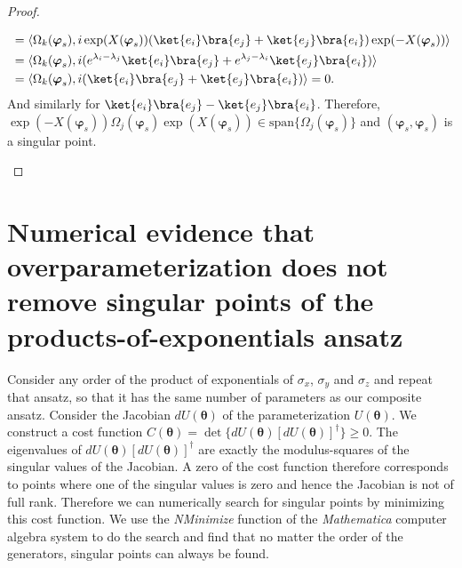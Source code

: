 \documentclass{article}
\renewcommand{\vec}[1]{\ensuremath{\boldsymbol{#1}}}
\begin{document}
\begin{proof}
\begin{itemize}
\begin{align}
            & = \langle \Omega_k(\vec{\varphi}_s), i\exp(X(\vec{\varphi}_s))(\ket{e_i}\bra{e_j} + \ket{e_j}\bra{e_i}) \exp(-X(\vec{\varphi}_s))\rangle \nonumber \\
            & = \langle \Omega_k(\vec{\varphi}_s) , i(e^{\lambda_i - \lambda_j}\ket{e_i}\bra{e_j} + e^{\lambda_j - \lambda_i}\ket{e_j}\bra{e_i}) \rangle \nonumber \\
            & = \langle \Omega_k(\vec{\varphi}_s) , i(\ket{e_i}\bra{e_j} + \ket{e_j}\bra{e_i}) \rangle = 0.
        \end{align}
        And similarly for \(\ket{e_i}\bra{e_j} - \ket{e_j}\bra{e_i}\).
        Therefore, \(\exp(-X(\vec{\varphi}_s)) \Omega_j(\vec{\varphi}_s) \exp(X(\vec{\varphi}_s)) \in \mathrm{span}\{\Omega_j(\vec{\varphi}_s)\}\) and \((\vec{\varphi}_s, \vec{\varphi}_s)\) is a singular point.
    \end{itemize}
\end{proof}

\section{Numerical evidence that overparameterization does not remove singular points of the products-of-exponentials ansatz}
\label{sec:numerical_evidence}
Consider any order of the product of exponentials of \(\sigma_x\), \(\sigma_y\) and \(\sigma_z\) and repeat that ansatz, so that it has the same number of parameters as our composite ansatz.
Consider the Jacobian \(dU(\vec{\theta})\) of the parameterization \(U(\vec{\theta})\).
We construct a cost function \(C(\vec{\theta}) = \det\{dU(\vec{\theta})[dU(\vec{\theta})]^\dagger\} \geq 0\).
The eigenvalues of \(dU(\vec{\theta})[dU(\vec{\theta})]^\dagger\) are exactly the modulus-squares of the singular values of the Jacobian.
A zero of the cost function therefore corresponds to points where one of the singular values is zero and hence the Jacobian is not of full rank.
Therefore we can numerically search for singular points by minimizing this cost function.
We use the \emph{NMinimize} function of the \emph{Mathematica} computer algebra system to do the search and find that no matter the order of the generators, singular points can always be found.
\end{document}
